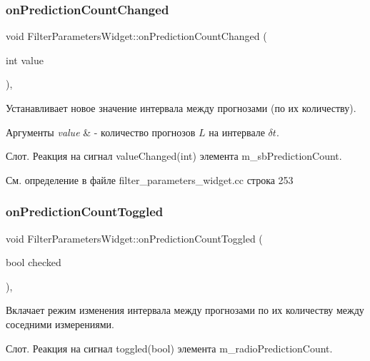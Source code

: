 \subsubsection{\texorpdfstring{on\+Prediction\+Count\+Changed}{onPredictionCountChanged}}
{\footnotesize\ttfamily void Filter\+Parameters\+Widget\+::on\+Prediction\+Count\+Changed (\begin{DoxyParamCaption}\item[{int}]{value }\end{DoxyParamCaption})\hspace{0.3cm}{\ttfamily [private]}, {\ttfamily [slot]}}



Устанавливает новое значение интервала между прогнозами (по их количеству). 


\begin{DoxyParams}{Аргументы}
{\em value} & -\/ количество прогнозов $L$ на интервале $\delta t$.\\
\hline
\end{DoxyParams}
Слот. Реакция на сигнал value\+Changed(int) элемента m\+\_\+sb\+Prediction\+Count. 

См. определение в файле filter\+\_\+parameters\+\_\+widget.\+cc строка 253

\hypertarget{class_filter_parameters_widget_af00a1550252f080c7647f3fbf684587b}{}\label{class_filter_parameters_widget_af00a1550252f080c7647f3fbf684587b} 
\subsubsection{\texorpdfstring{on\+Prediction\+Count\+Toggled}{onPredictionCountToggled}}
{\footnotesize\ttfamily void Filter\+Parameters\+Widget\+::on\+Prediction\+Count\+Toggled (\begin{DoxyParamCaption}\item[{bool}]{checked }\end{DoxyParamCaption})\hspace{0.3cm}{\ttfamily [private]}, {\ttfamily [slot]}}



Вклачает режим изменения интервала между прогнозами по их количеству между соседними измерениями. 

Слот. Реакция на сигнал toggled(bool) элемента m\+\_\+radio\+Prediction\+Count. 

